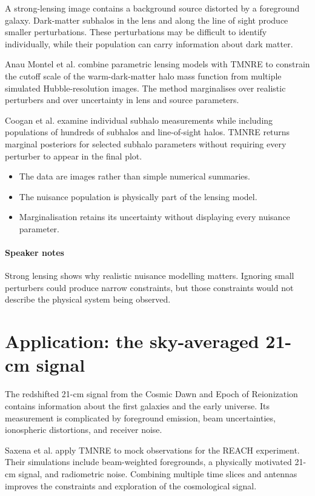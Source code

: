 ﻿\documentclass[13pt,a4paper]{article}
\begin{document}
A strong-lensing image contains a background source distorted by a foreground galaxy. Dark-matter subhalos in the lens and along the line of sight produce smaller perturbations. These perturbations may be difficult to identify individually, while their population can carry information about dark matter.

Anau Montel et al. combine parametric lensing models with TMNRE to constrain the cutoff scale of the warm-dark-matter halo mass function from multiple simulated Hubble-resolution images. The method marginalises over realistic perturbers and over uncertainty in lens and source parameters.

Coogan et al. examine individual subhalo measurements while including populations of hundreds of subhalos and line-of-sight halos. TMNRE returns marginal posteriors for selected subhalo parameters without requiring every perturber to appear in the final plot.

\begin{itemize}
\item The data are images rather than simple numerical summaries.
\item The nuisance population is physically part of the lensing model.
\item Marginalisation retains its uncertainty without displaying every nuisance parameter.
\end{itemize}

\paragraph{Speaker notes}

Strong lensing shows why realistic nuisance modelling matters. Ignoring small perturbers could produce narrow constraints, but those constraints would not describe the physical system being observed.

\section*{Application: the sky-averaged 21-cm signal}

The redshifted 21-cm signal from the Cosmic Dawn and Epoch of Reionization contains information about the first galaxies and the early universe. Its measurement is complicated by foreground emission, beam uncertainties, ionospheric distortions, and receiver noise.

Saxena et al. apply TMNRE to mock observations for the REACH experiment. Their simulations include beam-weighted foregrounds, a physically motivated 21-cm signal, and radiometric noise. Combining multiple time slices and antennas improves the constraints and exploration of the cosmological signal.
\end{document}
